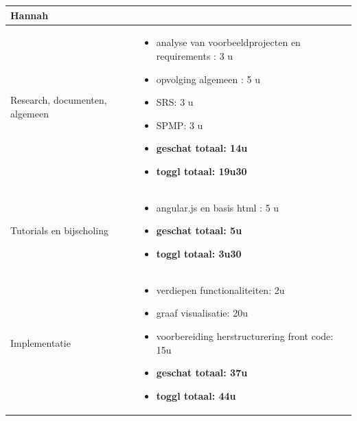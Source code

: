 \documentclass{article}
\begin{document}

\begin{center}
\begin{tabularx}{\textwidth}[t]{XX}
\arrayrulecolor{green}\hline

\arrayrulecolor{green}\hline
\vspace{.1 mm}
\textbf{\textcolor{myGreen}{\large{Hannah}}} \vspace{.1 mm} & \\
\hline
\vspace{1 mm}
Research, documenten, algemeen & 
\begin{minipage}[t]{\linewidth}%
\vspace{1 mm}
\begin{itemize}
\item analyse van voorbeeldprojecten en requirements : 3 u
\item opvolging algemeen : 5 u
\item SRS: 3 u
\item SPMP: 3 u
\item \textbf{geschat totaal: 14u}
\item \textbf{toggl totaal: 19u30}
\end{itemize} 
\vspace{1 mm}
\end{minipage}\\

\arrayrulecolor{black}\hline

\vspace{1 mm}
Tutorials en bijscholing & 
\begin{minipage}[t]{\linewidth}%
\vspace{1 mm}
\begin{itemize}
\item angular.js en basis html : 5 u
\item \textbf{geschat totaal: 5u}
\item \textbf{toggl totaal: 3u30}
\end{itemize} 
\vspace{1 mm}
\end{minipage}\\

\arrayrulecolor{black}\hline


\vspace{1 mm}
Implementatie & 
\begin{minipage}[t]{\linewidth}%
\vspace{1 mm}
\begin{itemize}
\item verdiepen functionaliteiten: 2u
\item graaf visualisatie: 20u
\item voorbereiding herstructurering front code: 15u 
\item \textbf{geschat totaal: 37u}
\item \textbf{toggl totaal: 44u}
\end{itemize} 
\vspace{1 mm}
\end{minipage}\\



\end{tabularx}
\end{center}
\end{document}
